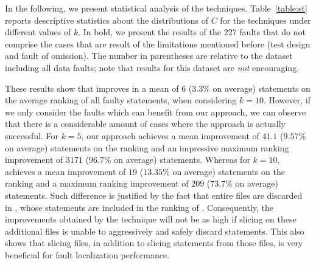 \documentclass{article}
\begin{document}
In the following, we present statistical analysis of the techniques.
Table~\ref{table:st} reports descriptive statistics about the
distributions of $C$ for the techniques under different values of $k$.
In bold, we present the results of the $227$ faults that do not
comprise the cases that are result of the limitations mentioned before
(test design and fault of omission). The number in parentheses are
relative to the dataset including all data faults; note that results
for this dataset are \emph{not} encouraging.

These results show that \ds{}
improves \sfl{} in a mean of $6$ ($3.3\%$ on average) statements on
the average ranking of all faulty statements, when considering
$k=10$.
However, if we only consider
the faults which can benefit from our approach, we can observe that
there is a considerable amount of cases where the approach is actually
successful. For $k=5$, our approach achieves a mean improvement of
$41.1$ ($9.57\%$ on average) statements on the ranking and an
impressive maximum ranking improvement of $3171$ ($96.7\%$ on average)
statements. Whereas for $k=10$,  achieves a mean
improvement of $19$ ($13.35\%$ on average) statements on the ranking
and a maximum ranking improvement of $209$ ($73.7\%$ on average)
statements. Such difference is justified by the fact that entire files
are discarded in , whose statements are included in the
ranking of . Consequently, the improvements obtained by
the technique will not be as high if slicing on these additional files
is unable to aggressively and safely discard statements. This also
shows that slicing files, in addition to slicing statements from those
files, is very beneficial for fault localization performance.
\end{document}
